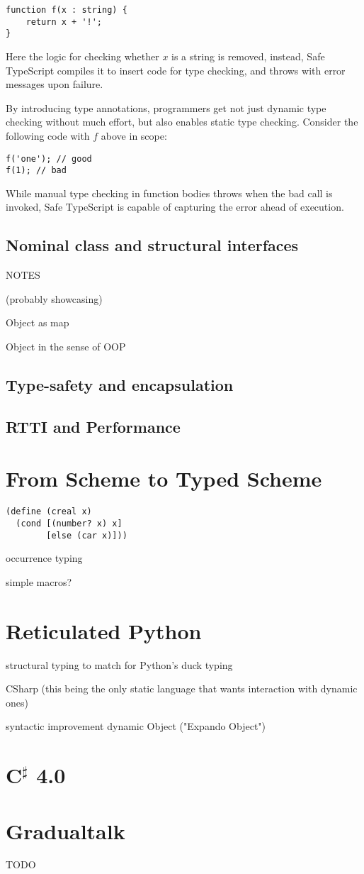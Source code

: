\begin{verbatim}
function f(x : string) {
    return x + '!';
}
\end{verbatim}

Here the logic for checking whether $x$ is a string is removed,
instead, Safe TypeScript compiles it to insert code for type checking,
and throws with error messages upon failure.

By introducing type annotations, programmers get not just dynamic type checking without
much effort, but also enables static type checking. Consider the following code with $f$
above in scope:

\begin{verbatim}
f('one'); // good
f(1); // bad
\end{verbatim}

While manual type checking in function bodies throws when the bad call is invoked,
Safe TypeScript is capable of capturing the error ahead of execution.

\subsection{Nominal class and structural interfaces}

NOTES

(probably showcasing)

Object as map

Object in the sense of OOP

\subsection{Type-safety and encapsulation}

\subsection{RTTI and Performance}


\section{From Scheme to Typed Scheme}



\begin{verbatim}
(define (creal x)
  (cond [(number? x) x]
        [else (car x)]))
\end{verbatim}

occurrence typing

simple macros?

\section{Reticulated Python}


structural typing to match for Python's duck typing

CSharp (this being the only static language that wants interaction with dynamic ones)

syntactic improvement
dynamic Object ("Expando Object")

\section{C$^\sharp$ 4.0}


\section{Gradualtalk}

TODO